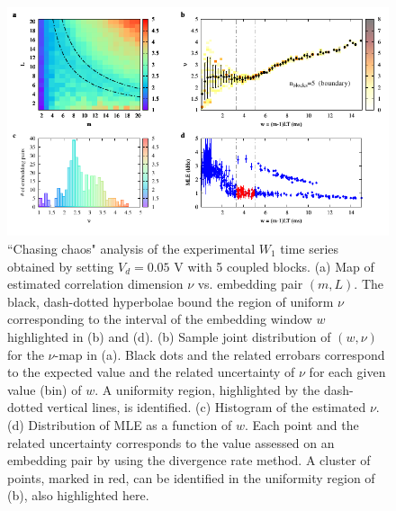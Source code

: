 \begin{figure}[H]
    \centering
    \includegraphics[width=\linewidth]{../blocks/5_blocks/edge/2e5_points/plots/chaos_low.pdf}
    \caption{``Chasing chaos" analysis of the experimental $W_1$ time series obtained by setting $V_d=0.05$ V with 5 coupled blocks.
    (a) Map of estimated correlation dimension $\nu$ vs. embedding pair $(m, L)$.
    The black, dash-dotted hyperbolae bound the region of uniform $\nu$ corresponding to the interval of the
    embedding window $w$ highlighted in (b) and (d).
    (b) Sample joint distribution of $(w,\nu)$ for the $\nu$-map in (a).
    Black dots and the related errobars correspond to the expected value and the related uncertainty of $\nu$
    for each given value (bin) of $w$. A uniformity region, highlighted by the dash-dotted vertical lines,
    is identified. (c) Histogram of the estimated $\nu$. (d) Distribution of MLE as a function of $w$. Each point and the related
    uncertainty corresponds to the value assessed on an embedding pair by using the divergence rate method.
    A cluster of points, marked in red, can be identified in the uniformity region of (b), also highlighted here.}
    \label{fig:5 blocks chaos}
\end{figure}

